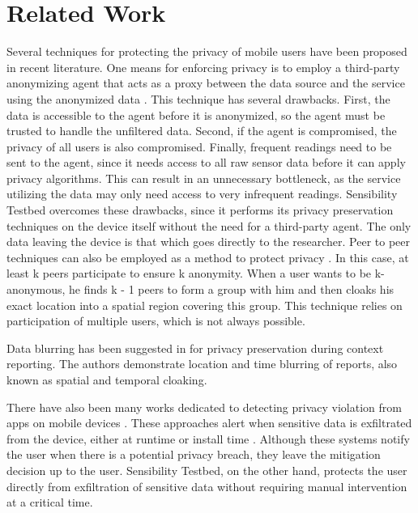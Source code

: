 \section{Related Work}\label{sec-related}

Several techniques for protecting the privacy of mobile users have
been proposed in recent literature. One means for enforcing privacy is
to employ a third-party anonymizing agent that acts as a proxy between
the data source and the service using the anonymized data
\cite{gruteser2003anonymous, mokbel2006new}. This technique has
several drawbacks. First, the data is accessible to the agent before it is anonymized, 
so the agent must be trusted to handle the unfiltered data. Second, if
the agent is compromised, the privacy of all users is also
compromised. Finally, frequent readings need to be sent to the agent,
since it needs access to all raw sensor data before it can apply
privacy algorithms. This can result in an unnecessary bottleneck, as
the service utilizing the data may only need access to very infrequent
readings. Sensibility Testbed overcomes these drawbacks, since it
performs its privacy preservation techniques on the device itself
without the need for a third-party agent. The only data leaving the
device is that which goes directly to the researcher. Peer to peer techniques 
can also be employed as a method to protect privacy \cite{ghinita2007mobihide}. In this case, 
at least k peers participate to ensure k anonymity. When a user wants 
to be k-anonymous, he finds k - 1 peers to form a group with him and then 
cloaks his exact location into a spatial region covering this group. This technique relies 
on participation of multiple users, which is not always possible.

Data blurring has been suggested in \cite{kapadia2008anonysense} for
privacy preservation during context reporting. The authors demonstrate
location and time blurring of reports, also known as spatial and
temporal cloaking. 

There have also been many works dedicated to detecting privacy
violation from apps on mobile devices \cite{chakraborty2014ipshield,
enck2014taintdroid, holavanalli2013flow}. These approaches alert when
sensitive data is exfiltrated from the device, either at runtime
\cite{chakraborty2014ipshield, enck2014taintdroid} or install time
\cite{holavanalli2013flow}.  Although
these systems notify the user when there is a potential privacy
breach, they leave the mitigation decision up to the user. Sensibility
Testbed, on the other hand, protects the user directly from
exfiltration of sensitive data without requiring manual intervention
at a critical time.
 
